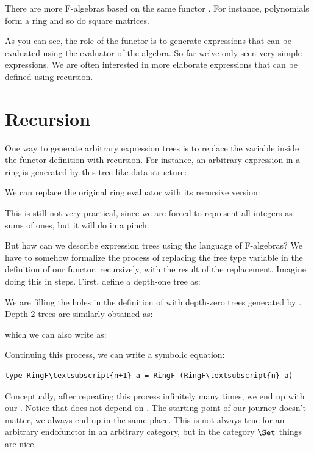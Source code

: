 There are more F-algebras based on the same functor . For
instance, polynomials form a ring and so do square matrices.

As you can see, the role of the functor is to generate expressions that
can be evaluated using the evaluator of the algebra. So far we've only
seen very simple expressions. We are often interested in more elaborate
expressions that can be defined using recursion.

\section{Recursion}

One way to generate arbitrary expression trees is to replace the
variable  inside the functor definition with recursion. For
instance, an arbitrary expression in a ring is generated by this
tree-like data structure:

We can replace the original ring evaluator with its recursive version:

This is still not very practical, since we are forced to represent all
integers as sums of ones, but it will do in a pinch.

But how can we describe expression trees using the language of
F-algebras? We have to somehow formalize the process of replacing the
free type variable in the definition of our functor, recursively, with
the result of the replacement. Imagine doing this in steps. First,
define a depth-one tree as:

We are filling the holes in the definition of  with
depth-zero trees generated by . Depth-2 trees are
similarly obtained as:

which we can also write as:

Continuing this process, we can write a symbolic equation:

\begin{Verbatim}[commandchars=\\\{\}]
type RingF\textsubscript{n+1} a = RingF (RingF\textsubscript{n} a)
\end{Verbatim}
Conceptually, after repeating this process infinitely many times, we end
up with our . Notice that  does not depend on
. The starting point of our journey doesn't matter, we always
end up in the same place. This is not always true for an arbitrary
endofunctor in an arbitrary category, but in the category $\Set$
things are nice.

